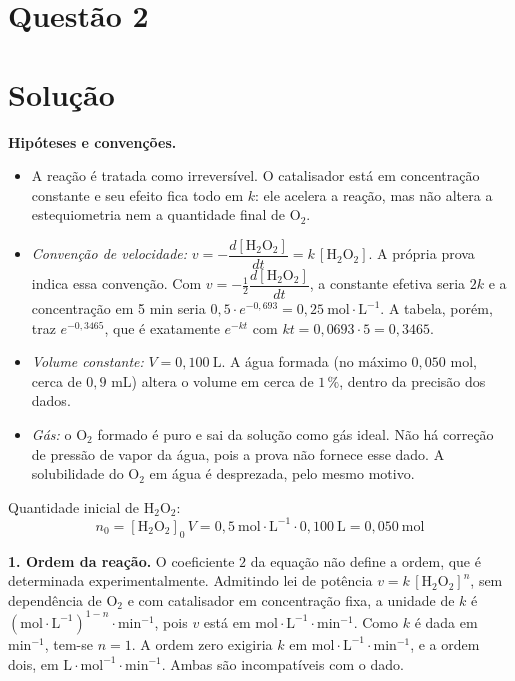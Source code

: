 \documentclass{article}%
\begin{document}
\section*{Questão 2}

\section*{Solução}

\textbf{Hipóteses e convenções.}
\begin{itemize}
\item A reação é tratada como irreversível. O catalisador está em concentração constante e seu efeito fica todo em $k$: ele acelera a reação, mas não altera a estequiometria nem a quantidade final de O$_2$.
\item \textit{Convenção de velocidade:} $v=-\dfrac{d[\mathrm{H_2O_2}]}{dt}=k\,[\mathrm{H_2O_2}]$. A própria prova indica essa convenção. Com $v=-\tfrac{1}{2}\dfrac{d[\mathrm{H_2O_2}]}{dt}$, a constante efetiva seria $2k$ e a concentração em 5 min seria $0{,}5\cdot e^{-0{,}693}=0{,}25\ \mathrm{mol\cdot L^{-1}}$. A tabela, porém, traz $e^{-0{,}3465}$, que é exatamente $e^{-kt}$ com $kt=0{,}0693\cdot 5=0{,}3465$.
\item \textit{Volume constante:} $V=0{,}100\ \mathrm{L}$. A água formada (no máximo $0{,}050$ mol, cerca de $0{,}9$ mL) altera o volume em cerca de $1\,\%$, dentro da precisão dos dados.
\item \textit{Gás:} o O$_2$ formado é puro e sai da solução como gás ideal. Não há correção de pressão de vapor da água, pois a prova não fornece esse dado. A solubilidade do O$_2$ em água é desprezada, pelo mesmo motivo.
\end{itemize}

Quantidade inicial de H$_2$O$_2$:
\[
n_0=[\mathrm{H_2O_2}]_0\,V=0{,}5\ \mathrm{mol\cdot L^{-1}}\cdot 0{,}100\ \mathrm{L}=0{,}050\ \mathrm{mol}
\]

\textbf{1. Ordem da reação.} O coeficiente $2$ da equação não define a ordem, que é determinada experimentalmente. Admitindo lei de potência $v=k\,[\mathrm{H_2O_2}]^{n}$, sem dependência de O$_2$ e com catalisador em concentração fixa, a unidade de $k$ é $(\mathrm{mol\cdot L^{-1}})^{1-n}\cdot\mathrm{min^{-1}}$, pois $v$ está em $\mathrm{mol\cdot L^{-1}\cdot min^{-1}}$. Como $k$ é dada em $\mathrm{min^{-1}}$, tem-se $n=1$. A ordem zero exigiria $k$ em $\mathrm{mol\cdot L^{-1}\cdot min^{-1}}$, e a ordem dois, em $\mathrm{L\cdot mol^{-1}\cdot min^{-1}}$. Ambas são incompatíveis com o dado.
\end{document}
